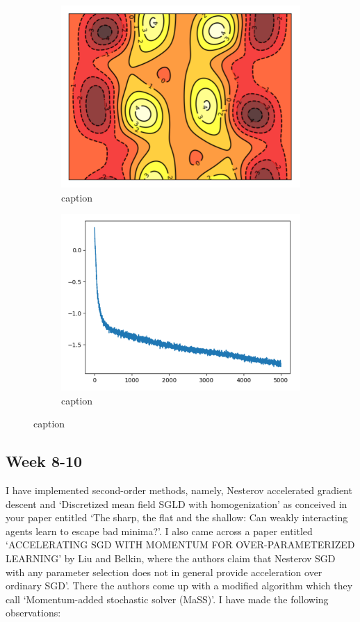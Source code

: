 \documentclass{article}
\begin{document}
\begin{figure}[H]
\begin{subfigure}{0.5\textwidth}
  \centering
  \includegraphics[width=0.8\linewidth]{images/Eijnden2018-heatmap-3dspin.png}
  \caption{ caption}
  \label{fig: description}
\end{subfigure}%
\begin{subfigure}{0.5\textwidth}
  \centering
  \includegraphics[width=0.8\linewidth]{images/Eijnden2018-loss.png}
  \caption{ caption}
  \label{fig:  description}
\end{subfigure}
\caption{ caption}
\label{fig:  label}
\end{figure}


\subsection{Week 8-10}

I have implemented second-order methods, namely, Nesterov accelerated gradient descent and ‘Discretized mean field SGLD with homogenization’ as conceived in your paper entitled ‘The sharp, the flat and the shallow: Can weakly interacting agents learn to escape bad minima?’. I also came across a paper entitled ‘ACCELERATING SGD WITH MOMENTUM FOR OVER-PARAMETERIZED LEARNING’ by Liu and Belkin, where the authors claim that Nesterov SGD with any parameter selection does not in general provide acceleration over ordinary SGD’. There the authors come up with a modified algorithm which they call ‘Momentum-added stochastic solver (MaSS)’. I have made the following observations:
 
\end{document}
